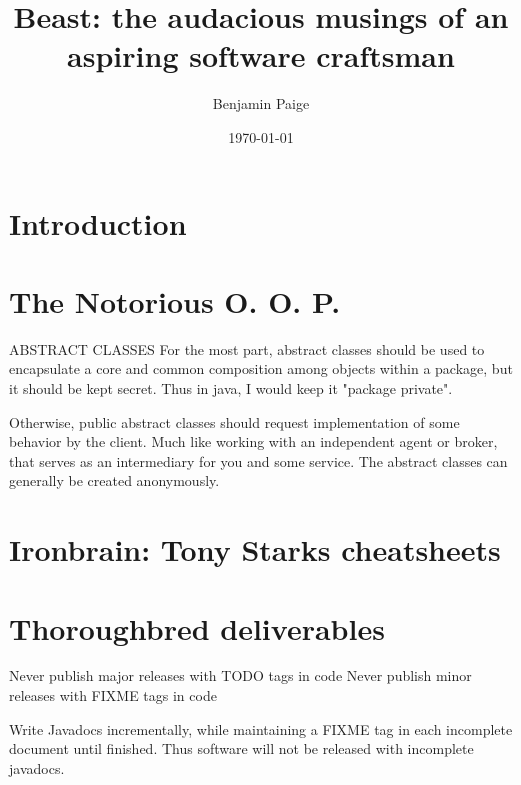 \documentclass{article}
\title{Beast: the audacious musings of an aspiring software craftsman}
\author{Benjamin Paige}
\date{\today}
\begin{document}
\maketitle

\tableofcontents

\section{Introduction}

\section{The Notorious O. O. P.}
ABSTRACT CLASSES
For the most part, abstract classes should be used to encapsulate a core and common composition among objects within a package, but it should be kept secret.
Thus in java, I would keep it "package private".

Otherwise, public abstract classes should request implementation of some behavior by the client.
Much like working with an independent agent or broker, that serves as an intermediary for you and some service.
The abstract classes can generally be created anonymously. 

\section{Ironbrain: Tony Starks cheatsheets}

\section{Thoroughbred deliverables}
Never publish major releases with TODO tags in code
Never publish minor releases with FIXME tags in code

Write Javadocs incrementally, while maintaining a FIXME tag in each incomplete document until finished. 
Thus software will not be released with incomplete javadocs.
\end{document}
